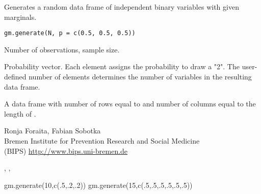 \begin{Description}\relax
Generates a random data frame of independent binary variables with given marginals.
\end{Description}
\begin{Usage}
\begin{verbatim}
gm.generate(N, p = c(0.5, 0.5, 0.5))
\end{verbatim}
\end{Usage}
\begin{Arguments}
\begin{ldescription}
\item[\code{N}] Number of observations, sample size. 
\item[\code{p}] Probability vector. Each element assigns the probability to draw a "2". The user-defined number of
elements determines the number of variables in the resulting data frame. 
\end{ldescription}
\end{Arguments}
\begin{Value}
A data frame with number of rows equal to  and number of columns equal to the length of .
\end{Value}
\begin{Author}\relax
Ronja Foraita, Fabian Sobotka \\
Bremen Institute for Prevention Research and Social Medicine \\
(BIPS)  \url{http://www.bips.uni-bremen.de}
\end{Author}
\begin{SeeAlso}\relax
{}, , 
\end{SeeAlso}
\begin{Examples}
\begin{ExampleCode}
gm.generate(10,c(.5,.2,.2))
gm.generate(15,c(.5,.5,.5,.5,.5,.5))
\end{ExampleCode}
\end{Examples}

